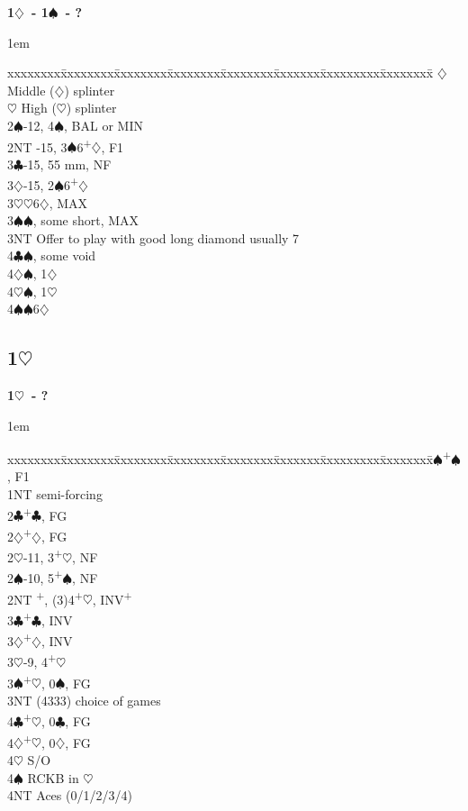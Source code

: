 \documentclass[10pt]{article}
\renewcommand{\c}{$\clubsuit$}
\renewcommand{\d}{$\diamondsuit$}
\newcommand{\h}{$\heartsuit$}
\newcommand{\s}{$\spadesuit$}
\newcommand{\p}{\textsuperscript{+}}
\newcommand{\m}{\textsuperscript{\textminus}}
\newenvironment{bidtable}[1][]
{\textbf{#1}
  \begin{adjustwidth}{1em}{}
    \addvspace{2pt}
    \begin{tabbing}
      xxxxxxxx\=xxxxxxxx\=xxxxxxxx\=xxxxxxxx\=xxxxxxxx\=xxxxxxx\=xxxxxxxxx\=xxxxxxxx\=\kill}
{\end{tabbing}\end{adjustwidth}\bigskip}%
\newcommand{\pdfh}{\texorpdfstring{\h{}}{H}}
\begin{document}
\begin{bidtable}[1\d\ - 1\s\ - ?]
     \>      \d \> Middle (\d) splinter                        \\
     \>      \h \> High (\h) splinter                          \\
2\s  {}-12, 4\s, BAL or MIN                                     \\
2NT  -15, 3\s 6\p\d, F1                                       \\
3\c  {}-15, 55 mm, NF                                           \\
3\d  {}-15, 2\m\s 6\p\d                                         \\
3\h  {}\h 6\d, MAX                                               \\
3\s  {}\s, some short, MAX                                       \\
3NT  \> Offer to play with good long diamond usually 7             \\
4\c  {}\s, some void                                             \\
4\d  {}\s, 1\d                                                   \\
4\h  {}\s, 1\h                                                   \\
4\s  {}\s 6\d
\end{bidtable}

\newpage
\subsection{1\pdfh}


\begin{bidtable}[1\h\ - ?]
1\s {}\p\s, F1              \\
1NT \> semi-forcing           \\
2\c {}\p\c, FG              \\
2\d {}\p\d, FG              \\
2\h {}-11, 3\p\h, NF        \\
2\s {}-10, 5\p\s, NF        \\
2NT \p, (3)4\p\h, INV\p  \\
3\c {}\p\c, INV             \\
3\d {}\p\d, INV             \\
3\h {}-9, 4\p\h             \\
3\s {}\p\h, 0\s, FG         \\
3NT \> (4333) choice of games \\
4\c {}\p\h, 0\c, FG         \\
4\d {}\p\h, 0\d, FG         \\
4\h \> S/O                    \\
4\s \> RCKB in \h             \\
4NT \> Aces (0/1/2/3/4)       \\
\end{bidtable}
\end{document}
